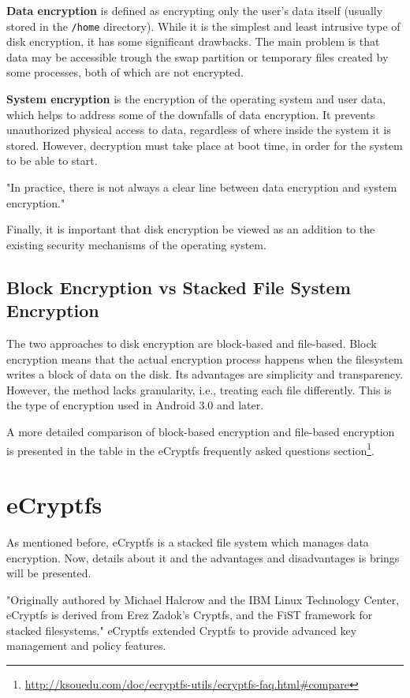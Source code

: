 \textbf{Data encryption} is defined as encrypting only the user's data itself (usually stored in the \texttt{/home} directory). While it is the simplest and least intrusive type of disk encryption, it has some significant drawbacks. The main problem is that data may be accessible trough the swap partition or temporary files created by some processes, both of which are not encrypted.

\textbf{System encryption} is the encryption of the operating system and user data, which helps to address some of the downfalls of data encryption. It prevents unauthorized physical access to data, regardless of where inside the system it is stored. However, decryption must take place at boot time, in order for the system to be able to start.

"In practice, there is not always a clear line between data encryption and system encryption\cite{disk-enc}."

Finally, it is important that disk encryption be viewed as an addition to the existing security mechanisms of the operating system.

\subsection{Block Encryption vs Stacked File System Encryption}
\label{sub-sec:be-vs-sfse}

The two approaches to disk encryption are block-based and file-based. Block encryption means that the actual encryption process happens when the filesystem writes a block of data on the disk. Its advantages are simplicity and transparency. However, the method lacks granularity, i.e., treating each file differently. This is the type of encryption used in Android 3.0 and later.

A more detailed comparison of block-based encryption and file-based encryption is presented in the table in the eCryptfs frequently asked questions section\footnote{\url{http://ksouedu.com/doc/ecryptfs-utils/ecryptfs-faq.html\#compare}}.

\section{eCryptfs}
\label{sec:de-ecryptfs}

As mentioned before, eCryptfs is a stacked file system which manages data encryption. Now, details about it and the advantages and disadvantages is brings will be presented.

"Originally authored by Michael Halcrow and the IBM Linux Technology Center, eCryptfs is derived from Erez Zadok's Cryptfs, and the FiST framework for stacked filesystems\cite{ab-ecr}." eCryptfs extended Cryptfs to provide advanced key management and policy features\cite{ecryptfs-paper}.

